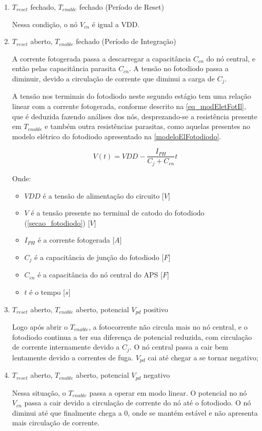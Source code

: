 \begin{enumerate}

\item $T_{reset}$ fechado, $T_{enable}$ fechado (Período de Reset)
    
Nessa condição, o n\'o $V_{cn}$ \'e igual a VDD.

\item $T_{reset}$ aberto, $T_{enable}$ fechado (Período de Integração)

A corrente fotogerada passa a descarregar a capacit\^ancia $C_{cn}$ do nó central, e então pelas capacitância parasita $C_{cn}$. A tensão no fotodiodo passa a diminuir, devido a circulação de corrente que diminui a carga de $C_{j}$.

A tensão nos terminais do fotodiodo neste segundo est\'agio tem uma relação linear com a corrente fotogerada, conforme descrito na \autoref{eq_modEletFotIl}, que \'e deduzida fazendo an\'alises dos n\'os, desprezando-se a resistência presente em $T_{enable}$ e também outra resistências parasitas, como aquelas presentes no modelo elétrico do fotodiodo apresentado na \autoref{modeloElFotodiodo}.

\begin{equation}
    \label{eq_modEletFotIl}
    V(t) = VDD-\frac{I_{PH}}{C_j+C_{cn}}t
\end{equation}

Onde:

\begin{itemize}
    \item $VDD$ \'e a tensão de alimentação do circuito [$V$]
    \item $V$ \'e a tensão presente no terminal de catodo do fotodiodo (\autoref{secao_fotodiodo}) [$V$]
    \item $I_{PH}$ \'e a corrente fotogerada [$A$]
    \item $C_j$ \'e a capacit\^ancia de junção do fotodiodo [$F$]
    \item $C_{cn}$ \'e a capacit\^ancia do n\'o central do APS [$F$]
    \item $t$ \'e o tempo [$s$]
\end{itemize}

\item $T_{reset}$ aberto, $T_{enable}$ aberto, potencial \textit{$V_{pd}$} positivo

Logo ap\'os abrir o $T_{enable}$, a fotocorrente não circula mais no n\'o central, e o fotodiodo continua a ter sua diferença de potencial reduzida, com circulação de corrente internamente devido a $C_j$. O n\'o central passa a cair bem lentamente devido a correntes de fuga. \textit{$V_{pd}$} cai at\'e chegar a se tornar negativo;

\item \textit{$T_{reset}$} aberto, \textit{$T_{enable}$} aberto, potencial \textit{$V_{pd}$} negativo

Nessa situação, o $T_{enable}$ passa a operar em modo linear. O potencial no n\'o $V_{cn}$ passa a cair devido a circulação de corrente do n\'o at\'e o fotodiodo. O nó diminui at\'e que finalmente chega a 0, onde se mant\'em estável e não apresenta mais circulação de corrente.

\end{enumerate}

